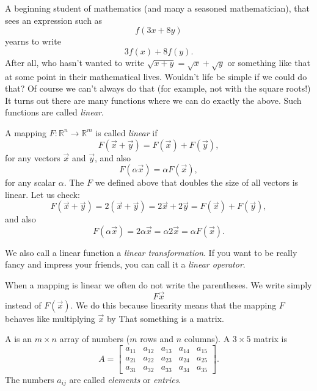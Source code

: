 A beginning student of mathematics (and many a seasoned mathematician),
that
sees an expression such as
\begin{equation*}
f(3x+8y)
\end{equation*}
yearns to write
\begin{equation*}
3f(x)+8f(y) .
\end{equation*}
After all, who hasn't wanted to write $\sqrt{x+y} = \sqrt{x} + \sqrt{y}$ or
something like that at some point in their mathematical lives.
Wouldn't life be simple if we could do that?
Of course we can't always do that (for example, not with the square roots!)
It turns out there are many functions where
we can do exactly the above.  Such functions are called \emph{linear}.

A mapping $F \colon {\mathbb R}^n \to {\mathbb R}^m$
is called \emph{linear} if
\begin{equation*}
F(\vec{x}+\vec{y}) = F(\vec{x})+F(\vec{y}),
\end{equation*}
for any vectors $\vec{x}$ and $\vec{y}$,
and also
\begin{equation*}
F(\alpha \vec{x}) = \alpha F(\vec{x}) ,
\end{equation*}
for any scalar $\alpha$.
The $F$ we defined above that doubles the size of all vectors is linear.  Let
us check:
\begin{equation*}
F(\vec{x}+\vec{y})
=
2(\vec{x}+\vec{y})
=
2\vec{x}+2\vec{y}
=
F(\vec{x})+F(\vec{y}) ,
\end{equation*}
and also
\begin{equation*}
F(\alpha \vec{x}) = 2 \alpha \vec{x} = \alpha 2 \vec{x} = \alpha F(\vec{x}) .
\end{equation*}

We also call a linear function a
\emph{linear transformation}.
If you want to be really fancy and impress your friends, you can call it a
\emph{linear operator}.

When a mapping is linear we often do not write the parentheses.  We write
simply
\begin{equation*}
F \vec{x}
\end{equation*}
instead of $F(\vec{x})$.  We do this because linearity means that the
mapping $F$
behaves like multiplying $\vec{x}$ by 
That something is a matrix.

A \emph{}
is an $m
\times n$ array of numbers ($m$ rows and $n$ columns).  A
$3 \times 5$ matrix is
\begin{equation*}
A = 
\begin{bmatrix}
a_{11} & a_{12} & a_{13} & a_{14} & a_{15} \\
a_{21} & a_{22} & a_{23} & a_{24} & a_{25} \\
a_{31} & a_{32} & a_{33} & a_{34} & a_{35}
\end{bmatrix} .
\end{equation*}
The numbers $a_{ij}$ are called \emph{elements}
or \emph{entries}.

